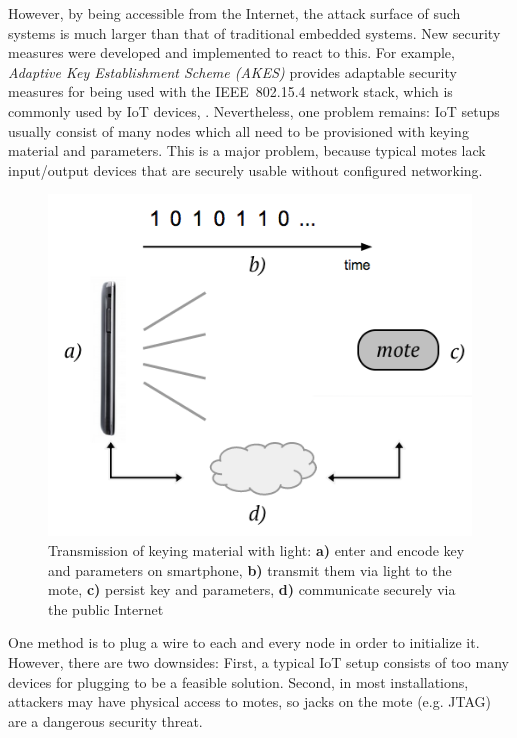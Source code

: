 \documentclass{sig-alternate} %
\begin{document}
However, by being accessible from the Internet, the attack surface of such systems is much larger than that of traditional embedded systems.
New security measures were developed and implemented to react to this.
For example, \textit{Adaptive Key Establishment Scheme (AKES)} provides adaptable security measures for being used with the IEEE~802.15.4 network stack, which is commonly used by IoT devices, \cite{krentz15akes}.
Nevertheless, one problem remains: IoT setups usually consist of many nodes which all need to be provisioned with keying material and parameters.
This is a major problem, because typical motes lack input/output devices that are securely usable without configured networking.

\begin{figure}
	\centering
	\includegraphics[scale=.4]{images/overview.png}
	\caption{Transmission of keying material with light: \textbf{a)} enter and encode key and parameters on smartphone, \textbf{b)} transmit them via light to the mote, \textbf{c)} persist key and parameters, \textbf{d)} communicate securely via the public Internet }
	\label{fig:overview}
\end{figure}

One method is to plug a wire to each and every node in order to initialize it.
However, there are two downsides: First, a typical IoT setup consists of too many devices for plugging to be a feasible solution. Second, in most installations, attackers may have physical access to motes, so jacks on the mote (e.g. JTAG) are a dangerous security threat.
\end{document}
